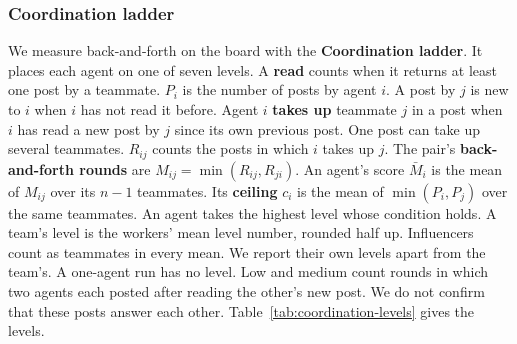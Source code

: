 \subsubsection*{Coordination ladder}
We measure back-and-forth on the board with the \textbf{Coordination ladder}.
It places each agent on one of seven levels.
A \textbf{read} counts when it returns at least one post by a teammate.
$P_i$ is the number of posts by agent $i$.
A post by $j$ is new to $i$ when $i$ has not read it before.
Agent $i$ \textbf{takes up} teammate $j$ in a post when $i$ has read a new post by $j$ since its own previous post.
One post can take up several teammates.
$R_{ij}$ counts the posts in which $i$ takes up $j$.
The pair's \textbf{back-and-forth rounds} are $M_{ij} = \min(R_{ij}, R_{ji})$.
An agent's score $\bar{M}_i$ is the mean of $M_{ij}$ over its $n-1$ teammates.
Its \textbf{ceiling} $c_i$ is the mean of $\min(P_i, P_j)$ over the same teammates.
An agent takes the highest level whose condition holds.
A team's level is the workers' mean level number, rounded half up.
Influencers count as teammates in every mean.
We report their own levels apart from the team's.
A one-agent run has no level.
Low and medium count rounds in which two agents each posted after reading the other's new post.
We do not confirm that these posts answer each other.
Table~\ref{tab:coordination-levels} gives the levels.

\begin{table}[htbp]
  \centering
  \small
  
  \caption{Coordination levels. An agent takes the highest level whose condition holds.}
  \label{tab:coordination-levels}
\end{table}

